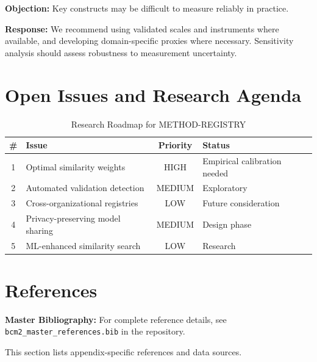 \textbf{Objection:} Key constructs may be difficult to measure reliably in
practice.

\textbf{Response:} We recommend using validated scales and instruments where
available, and developing domain-specific proxies where necessary. Sensitivity
analysis should assess robustness to measurement uncertainty.


\section{Open Issues and Research Agenda}
\label{sec:fff-open}

\begin{table}[htbp]
\centering
\caption{Research Roadmap for METHOD-REGISTRY}
\label{tab:fff-roadmap}
\renewcommand{\arraystretch}{1.3}
\begin{tabular}{@{}clcl@{}}
\toprule
\textbf{\#} & \textbf{Issue} & \textbf{Priority} & \textbf{Status} \\
\midrule
1 & Optimal similarity weights & HIGH & Empirical calibration needed \\
2 & Automated validation detection & MEDIUM & Exploratory \\
3 & Cross-organizational registries & LOW & Future consideration \\
4 & Privacy-preserving model sharing & MEDIUM & Design phase \\
5 & ML-enhanced similarity search & LOW & Research \\
\bottomrule
\end{tabular}
\end{table}


\section{References}
\label{sec:fff-references}

\begin{tcolorbox}[colback=blue!5!white, colframe=blue!75!black]
\textbf{Master Bibliography:} For complete reference details, see
\texttt{bcm2\_master\_references.bib} in the repository.

This section lists appendix-specific references and data sources.
\end{tcolorbox}

